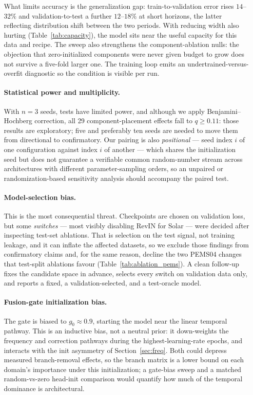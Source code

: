 \documentclass[review,12pt]{elsarticle}
\begin{document}
What limits accuracy is the generalization gap: train-to-validation error
rises $14$--$32\%$ and validation-to-test a further $12$--$18\%$ at short
horizons, the latter reflecting distribution shift between the two periods.
With reducing width also hurting (Table~\ref{tab:capacity}), the model sits
near the useful capacity for this data and recipe. The sweep also strengthens
the component-ablation nulls: the objection that zero-initialized components
were never given budget to grow does not survive a five-fold larger one. The
training loop emits an undertrained-versus-overfit diagnostic so the
condition is visible per run.

\paragraph{Statistical power and multiplicity.} With $n{=}3$ seeds, tests
have limited power, and although we apply Benjamini--Hochberg correction,
all 29 component-placement effects fall to $q\ge0.11$: those results are
exploratory; five and preferably ten seeds are needed to move them from
directional to confirmatory. Our pairing is also \emph{positional} --- seed
index $i$ of one configuration against index $i$ of another --- which shares
the initialization seed but does not guarantee a verifiable common
random-number stream across architectures with different parameter-sampling
orders, so an unpaired or randomization-based sensitivity analysis should
accompany the paired test.

\paragraph{Model-selection bias.} This is the most consequential threat.
Checkpoints are chosen on validation loss, but some \emph{switches} --- most
visibly disabling RevIN for Solar --- were decided after inspecting test-set
ablations. That is selection on the test signal, not training leakage, and it
can inflate the affected datasets, so we exclude those findings from
confirmatory claims and, for the same reason, decline the two PEMS04 changes
that test-split ablations favour (Table~\ref{tab:ablation_pems}). A clean
follow-up fixes the candidate space in advance, selects every switch on
validation data only, and reports a fixed, a validation-selected, and a
test-oracle model.

\paragraph{Fusion-gate initialization bias.} The gate is biased to
$g_0\!\approx\!0.9$, starting the model near the linear temporal pathway.
This is an inductive bias, not a neutral prior: it down-weights the frequency
and correction pathways during the highest-learning-rate epochs, and
interacts with the init asymmetry of Section~\ref{sec:freq}. Both could
depress measured branch-removal effects, so the branch matrix is a lower
bound on each domain's importance under this initialization; a gate-bias
sweep and a matched random-vs-zero head-init comparison would quantify how
much of the temporal dominance is architectural.
\end{document}
